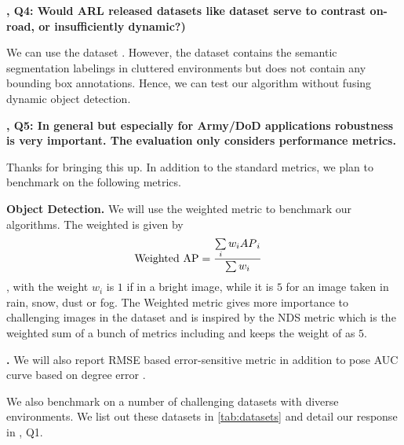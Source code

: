 \documentclass[12pt]{article}
\newcommand{\revThree}{{\color{my_magenta}{R3}}}
\begin{document}
    \textbf{\revThree, Q4: Would ARL released datasets like \rugd dataset serve to contrast on-road, or insufficiently dynamic?)}
    
    We can use the \rugd dataset \cite{weigness2019rugd}. 
    However, the \rugd dataset contains the semantic segmentation labelings in cluttered environments but does not contain any bounding box annotations.
    Hence, we can test our algorithm without fusing dynamic object detection.

    \textbf{\revThree, Q5: In general but especially for Army/DoD applications robustness is very important. The evaluation only considers performance metrics.}
    
    Thanks for bringing this up. 
    In addition to the standard metrics, we plan to benchmark on the following metrics.
    \begin{compactitem}
    \item \textbf{Object Detection.} We will use the weighted \ap metric to benchmark our algorithms. 
    The weighted \ap is given by
    \begin{align}
        \text{Weighted AP} &= \frac{\sum\limits_{i} w_i AP{}_i}{\sum{w_i}}
    \end{align},
    with the weight $w_i$ is $1$ if in a bright image, while it is $5$ for an image taken in rain, snow, dust or fog. 
    The Weighted \ap metric gives more importance to challenging images in the dataset and is inspired by the \nuscenes NDS metric \cite{caesar2020nuscenes} which is the weighted sum of a bunch of metrics including \ap and keeps the weight of \ap as $5$.
    
    \item \textbf{\slam .} We will also report RMSE based error-sensitive metric in addition to pose AUC curve based on degree error . 
    \end{compactitem}

    We also benchmark on a number of challenging datasets with diverse environments. 
    We list out these datasets in \cref{tab:datasets} and detail our response in \revThree, Q1.
    
    
\end{document}
